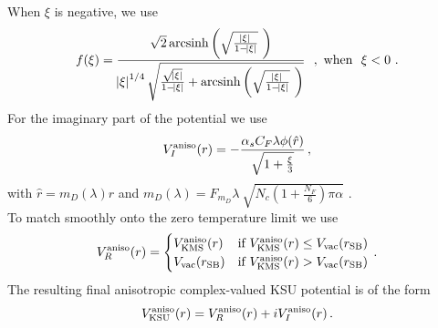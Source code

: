 \documentclass[times,sort&compress,final]{elsarticle}
\DeclareMathOperator{\arcsinh}{arcsinh}
\newcommand{\redflag}[1]{{\color{red} #1}}
\def\qtraj{{\tt QTraj} }
\begin{document}
When $\xi$ is negative, we use 
%
\begin{equation}
f(\xi) = \frac{\sqrt{2}\arcsinh{\left(\sqrt{\frac{\abs{\xi}}{1-\abs{\xi}}}~\right)}}{\abs{\xi}^{1/4}\sqrt{\frac{\sqrt{\abs{\xi}}}{1-\abs{\xi}}+\arcsinh{\left(\sqrt{\frac{\abs{\xi}}{1-\abs{\xi}}}~\right)}}}~~,~\mathrm{when}~~\xi< 0 ~.
\end{equation}
%
For the imaginary part of the potential we use \cite{islamforth}
%
\begin{equation}
V^{\rm aniso}_I (r) = - \frac{\alpha_s C_F \lambda \phi (\hat{r})}{ \sqrt{1 + \frac{\xi}{3}} } \, ,
\label{eq:allanisoimv}
\end{equation}
%
with $\hat{r} = m_D(\lambda) r$ and $m_D(\lambda)=F_{m_D}\lambda~\sqrt{N_c\left(1+\frac{N_F}{6}\right)\pi\alpha}$ .\\
To match smoothly onto the zero temperature limit we use
%
\begin{equation}
V^{\rm aniso}_R (r)=
\begin{cases}  V^{\rm aniso}_{\rm KMS}(r)  &\mbox{if } V^{\rm aniso}_{\rm KMS}(r)  \leq V_{\rm vac}(r_{\rm SB}) \\
V_{\rm vac}(r_{\rm SB}) & \mbox{if } V^{\rm aniso}_{\rm KMS}(r) > V_{\rm vac}(r_{\rm SB})
\end{cases} \, .
\label{eq:vmedre}
\end{equation}
%
The resulting final anisotropic complex-valued KSU potential is of the form 
%
\begin{equation}
V^{\rm aniso}_{\rm KSU}  (r) = V^{\rm aniso}_R (r) + i V^{\rm aniso}_I (r) \, .
\label{eq:vform}
\end{equation}
%





\end{document}
